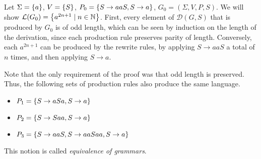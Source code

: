 \begin{example}
	Let \( \Sigma = \qty{a} \), \( V = \qty{S} \), \( P_0 = \qty{S \to aaS, S \to a} \), \( G_0 = (\Sigma, V, P, S) \).
	We will show \( \mathcal L(G_0) = \qty{a^{2n+1} \mid n \in \mathbb N} \).
	First, every element of \( \mathcal D(G,S) \) that is produced by \( G_0 \) is of odd length, which can be seen by induction on the length of the derivation, since each production rule preserves parity of length.
	Conversely, each \( a^{2n+1} \) can be produced by the rewrite rules, by applying \( S \to aaS \) a total of \( n \) times, and then applying \( S \to a \).

	Note that the only requirement of the proof was that odd length is preserved. Thus, the following sets of production rules also produce the same language.
	\begin{itemize}
	\item \( P_1 = \qty{S \to aSa, S \to a} \)
	\item \( P_2 = \qty{S \to Saa, S \to a} \)
	\item \( P_3 = \qty{S \to aaS, S \to aaSaa, S \to a} \)
	\end{itemize}
	This notion is called \emph{equivalence of grammars}.
\end{example}

